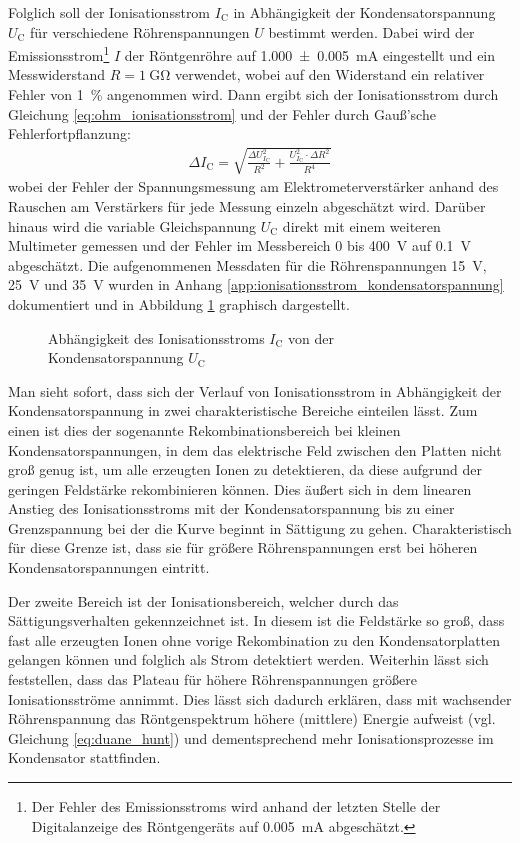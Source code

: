 \documentclass[11pt, a4paper]{article}
\numberwithin{equation}{section}
\begin{document}
Folglich soll der Ionisationsstrom $I_\mathrm{C}$ in Abhängigkeit der Kondensatorspannung $U_\mathrm{C}$ für verschiedene Röhrenspannungen $U$ bestimmt werden.
Dabei wird der Emissionsstrom\footnote{Der Fehler des Emissionsstroms wird anhand der letzten Stelle der Digitalanzeige des Röntgengeräts auf \SI{0.005}{\milli\ampere} abgeschätzt.} $I$ der Röntgenröhre auf \SI{1.000 +- 0.005}{mA} eingestellt und ein Messwiderstand $R = \SI{1}{\giga\ohm}$ verwendet, wobei auf den Widerstand ein relativer Fehler von \SI{1}{\percent} angenommen wird.
Dann ergibt sich der Ionisationsstrom durch Gleichung \ref{eq:ohm_ionisationsstrom} und der Fehler durch Gauß'sche Fehlerfortpflanzung:
\begin{align}
	\Delta I_\mathrm{C} = \sqrt{\frac{\Delta U_{I_\mathrm{C}}^2}{R^2} + \frac{U_{I_\mathrm{C}}^2 \cdot \Delta R^2}{R^4}}
\end{align}
wobei der Fehler der Spannungsmessung am Elektrometerverstärker anhand des Rauschen am Verstärkers für jede Messung einzeln abgeschätzt wird.
Darüber hinaus wird die variable Gleichspannung $U_\mathrm{C}$ direkt mit einem weiteren Multimeter gemessen und der Fehler im Messbereich \num{0} bis \SI{400}{V} auf \SI{0.1}{V} abgeschätzt.
Die aufgenommenen Messdaten für die Röhrenspannungen \SI{15}{V}, \SI{25}{V} und \SI{35}{V} wurden in Anhang \ref{app:ionisationsstrom_kondensatorspannung} dokumentiert und in Abbildung \ref{fig:kondensatorspannung} graphisch dargestellt.
\begin{figure}[ht]
	\centering
	
	\caption{Abhängigkeit des Ionisationsstroms $I_\mathrm{C}$ von der Kondensatorspannung $U_\mathrm{C}$}
	\label{fig:kondensatorspannung}
\end{figure}
Man sieht sofort, dass sich der Verlauf von Ionisationsstrom in Abhängigkeit der Kondensatorspannung in zwei charakteristische Bereiche einteilen lässt.
Zum einen ist dies der sogenannte Rekombinationsbereich bei kleinen Kondensatorspannungen, in dem das elektrische Feld zwischen den Platten nicht groß genug ist, um alle erzeugten Ionen zu detektieren, da diese aufgrund der geringen Feldstärke rekombinieren können.
Dies äußert sich in dem linearen Anstieg des Ionisationsstroms mit der Kondensatorspannung bis zu einer Grenzspannung bei der die Kurve beginnt in Sättigung zu gehen.
Charakteristisch für diese Grenze ist, dass sie für größere Röhrenspannungen erst bei höheren Kondensatorspannungen eintritt.

Der zweite Bereich ist der Ionisationsbereich, welcher durch das Sättigungsverhalten gekennzeichnet ist.
In diesem ist die Feldstärke so groß, dass fast alle erzeugten Ionen ohne vorige Rekombination zu den Kondensatorplatten gelangen können und folglich als Strom detektiert werden.
Weiterhin lässt sich feststellen, dass das Plateau für höhere Röhrenspannungen größere Ionisationsströme annimmt.
Dies lässt sich dadurch erklären, dass mit wachsender Röhrenspannung das Röntgenspektrum höhere (mittlere) Energie aufweist (vgl. Gleichung \ref{eq:duane_hunt}) und dementsprechend mehr Ionisationsprozesse im Kondensator stattfinden.
\end{document}
